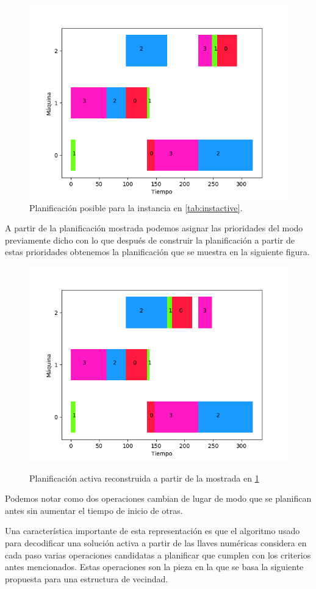 \begin{figure}[H]
     \centering
     \includegraphics[scale=.7]{Imagenes/ganttnonactivepr.png}
     \caption{Planificación posible para la instancia en \ref{tab:instactive}. }
     \label{fig:nonactivepr}
\end{figure}
A partir de la planificación mostrada podemos asignar las prioridades del modo previamente dicho con lo que después de construir la planificación a partir de estas prioridades obtenemos la planificación que se muestra en la siguiente figura.
\begin{figure}[H]
     \centering
     \includegraphics[scale=.7]{Imagenes/ganttactivepr.png}
     \label{fig:activepr}
     \caption{Planificación activa reconstruida a partir de la mostrada en \ref{fig:nonactivepr}}
\end{figure}

Podemos notar como dos operaciones cambian de lugar de modo que se planifican antes sin aumentar el tiempo de inicio de otras.

Una característica importante de esta representación es que el algoritmo usado para decodificar una solución activa a partir de las llaves numéricas considera en cada paso varias operaciones candidatas a planificar que cumplen con los criterios antes mencionados. Estas operaciones son la pieza en la que se basa la siguiente propuesta para una estructura de vecindad.
